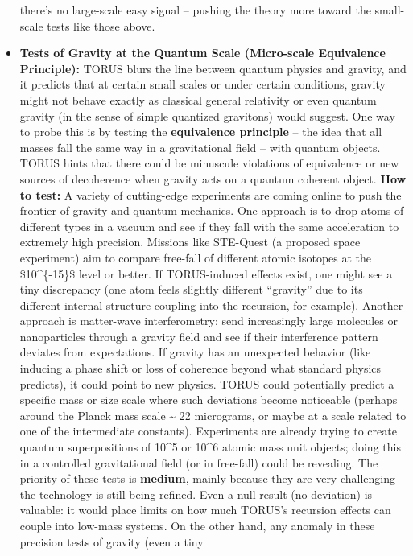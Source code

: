 \documentclass[]{article}
\begin{document}
\begin{itemize}
  there's no large-scale easy signal -- pushing the theory more toward
  the small-scale tests like those above.
\item
  \textbf{Tests of Gravity at the Quantum Scale (Micro-scale Equivalence
  Principle):} TORUS blurs the line between quantum physics and gravity,
  and it predicts that at certain small scales or under certain
  conditions, gravity might not behave exactly as classical general
  relativity or even quantum gravity (in the sense of simple quantized
  gravitons) would suggest. One way to probe this is by testing the
  \textbf{equivalence principle} -- the idea that all masses fall the
  same way in a gravitational field -- with quantum objects. TORUS hints
  that there could be minuscule violations of equivalence or new sources
  of decoherence when gravity acts on a quantum coherent object.
  \textbf{How to test:} A variety of cutting-edge experiments are coming
  online to push the frontier of gravity and quantum mechanics. One
  approach is to drop atoms of different types in a vacuum and see if
  they fall with the same acceleration to extremely high precision.
  Missions like STE-Quest (a proposed space experiment) aim to compare
  free-fall of different atomic isotopes at the \$10\^{}\{-15\}\$ level
  or better​. If TORUS-induced effects exist, one might see a tiny
  discrepancy (one atom feels slightly different ``gravity'' due to its
  different internal structure coupling into the recursion, for
  example). Another approach is matter-wave interferometry: send
  increasingly large molecules or nanoparticles through a gravity field
  and see if their interference pattern deviates from expectations. If
  gravity has an unexpected behavior (like inducing a phase shift or
  loss of coherence beyond what standard physics predicts), it could
  point to new physics. TORUS could potentially predict a specific mass
  or size scale where such deviations become noticeable (perhaps around
  the Planck mass scale \textasciitilde{} 22 micrograms, or maybe at a
  scale related to one of the intermediate constants). Experiments are
  already trying to create quantum superpositions of 10\^{}5 or 10\^{}6
  atomic mass unit objects; doing this in a controlled gravitational
  field (or in free-fall) could be revealing​. The priority of these
  tests is \textbf{medium}, mainly because they are very challenging --
  the technology is still being refined. Even a null result (no
  deviation) is valuable: it would place limits on how much TORUS's
  recursion effects can couple into low-mass systems​. On the other
  hand, any anomaly in these precision tests of gravity (even a tiny

\end{itemize}
\end{document}
